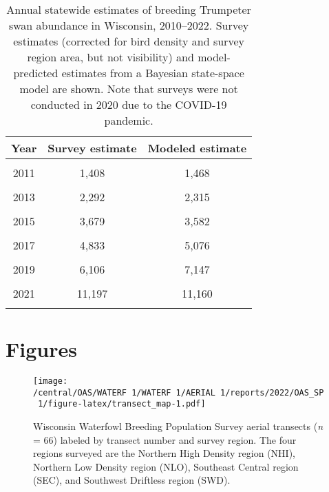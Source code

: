 \documentclass[
  12pt,
]{article}
\begin{document}
\newpage

\begin{table}[!h]

\caption{\label{tab:trump_tab}Annual statewide estimates of breeding Trumpeter swan abundance in Wisconsin, 2010--2022. Survey estimates (corrected for bird density and survey region area, but not visibility) and model-predicted estimates from a Bayesian state-space model are shown. Note that surveys were not conducted in 2020 due to the COVID-19 pandemic.}
\centering
\begin{tabular}[t]{ccc}
\toprule
\textbf{Year} & \textbf{Survey estimate} & \textbf{Modeled estimate}\\
\midrule
\cellcolor{gray!6}{2010} & \cellcolor{gray!6}{1,237} & \cellcolor{gray!6}{1,203}\\
2011 & 1,408 & 1,468\\
\cellcolor{gray!6}{2012} & \cellcolor{gray!6}{1,999} & \cellcolor{gray!6}{1,883}\\
2013 & 2,292 & 2,315\\
\cellcolor{gray!6}{2014} & \cellcolor{gray!6}{2,979} & \cellcolor{gray!6}{2,906}\\
2015 & 3,679 & 3,582\\
\cellcolor{gray!6}{2016} & \cellcolor{gray!6}{5,029} & \cellcolor{gray!6}{4,469}\\
2017 & 4,833 & 5,076\\
\cellcolor{gray!6}{2018} & \cellcolor{gray!6}{5,677} & \cellcolor{gray!6}{6,019}\\
2019 & 6,106 & 7,147\\
\cellcolor{gray!6}{2020} & \cellcolor{gray!6}{} & \cellcolor{gray!6}{9,303}\\
2021 & 11,197 & 11,160\\
\cellcolor{gray!6}{2022} & \cellcolor{gray!6}{11,919} & \cellcolor{gray!6}{13,320}\\
\bottomrule
\end{tabular}
\end{table}

\newpage

\hypertarget{figures}{%
\section{Figures}\label{figures}}

\begin{figure}
\centering
\texttt{[image: /central/OAS/WATERF~1/WATERF~1/AERIAL~1/reports/2022/OAS\_SP~1/figure-latex/transect\_map-1.pdf]}
\caption{\label{fig:transect_map}Wisconsin Waterfowl Breeding Population
Survey aerial transects (\emph{n} = 66) labeled by transect number and
survey region. The four regions surveyed are the Northern High Density
region (NHI), Northern Low Density region (NLO), Southeast Central
region (SEC), and Southwest Driftless region (SWD).}
\end{figure}
\end{document}
